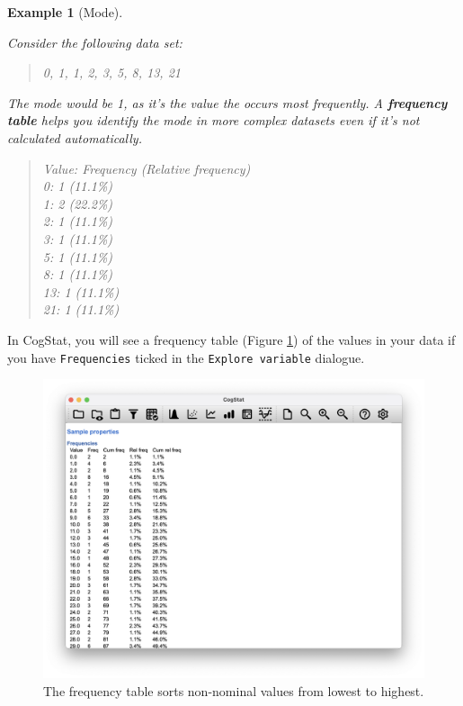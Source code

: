 \documentclass[
  11pt,
]{book}
\theoremstyle{indenteddefinition}
\theoremstyle{indenteddefinition}
\newtheorem{example}{Example}[chapter]
\theoremstyle{definition}
\theoremstyle{definition}
\theoremstyle{remark}
\begin{document}
\begin{example}[Mode]
\protect\hypertarget{exm:exmode}{}\label{exm:exmode}

Consider the following data set:

\begin{quote}
0, 1, 1, 2, 3, 5, 8, 13, 21
\end{quote}

The mode would be 1, as it's the value the occurs most frequently. A \textbf{frequency table} helps you identify the mode in more complex datasets even if it's not calculated automatically.

\begin{quote}
Value: Frequency (Relative frequency)\\
0: 1 (11.1\%)\\
1: 2 (22.2\%)\\
2: 1 (11.1\%)\\
3: 1 (11.1\%)\\
5: 1 (11.1\%)\\
8: 1 (11.1\%)\\
13: 1 (11.1\%)\\
21: 1 (11.1\%)\\
\end{quote}

\end{example}

In CogStat, you will see a frequency table (Figure \ref{fig:freqaflsmall}) of the values in your data if you have \texttt{Frequencies} ticked in the \texttt{Explore\ variable} dialogue.

\begin{figure}

{\centering \includegraphics[width=0.66\linewidth]{resources/image/cogstatfrequencyaflsmall} 

}

\caption{The frequency table sorts non-nominal values from lowest to highest.}\label{fig:freqaflsmall}
\end{figure}
\end{document}
